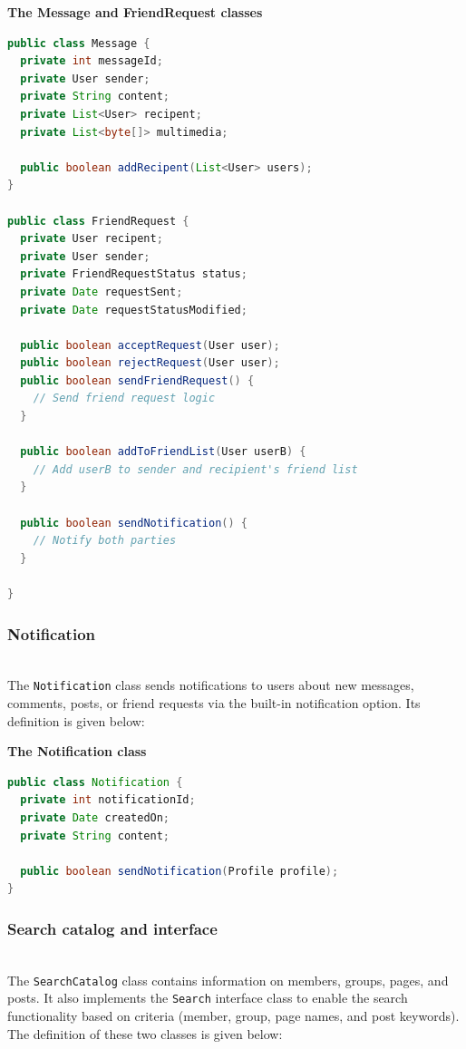 \textbf{The Message and FriendRequest classes}

\begin{lstlisting}[language=Java]
public class Message {
  private int messageId;
  private User sender;
  private String content;
  private List<User> recipent;
  private List<byte[]> multimedia;

  public boolean addRecipent(List<User> users);
}

public class FriendRequest {
  private User recipent;
  private User sender;
  private FriendRequestStatus status;
  private Date requestSent;
  private Date requestStatusModified;

  public boolean acceptRequest(User user);
  public boolean rejectRequest(User user);
  public boolean sendFriendRequest() {
    // Send friend request logic
  }
  
  public boolean addToFriendList(User userB) {
    // Add userB to sender and recipient's friend list
  }
  
  public boolean sendNotification() {
    // Notify both parties
  }

}
\end{lstlisting}

\subsubsection{Notification}\label{0ZVCay7W6Bkab1KXP_cLz}
\\
The \texttt{Notification} class sends notifications to users about new messages, comments, posts, or friend requests via the built-in notification option. Its definition is given below:

\textbf{The Notification class}

\begin{lstlisting}[language=Java]
public class Notification {
  private int notificationId;
  private Date createdOn;
  private String content;

  public boolean sendNotification(Profile profile);
}
\end{lstlisting}

\subsubsection{Search catalog and interface}\label{julu7b82zRwsJjYIajaE4-2}
\\
The \texttt{SearchCatalog} class contains information on members, groups, pages, and posts. It also implements the \texttt{Search} interface class to enable the search functionality based on criteria (member, group, page names, and post keywords). The definition of these two classes is given below:

